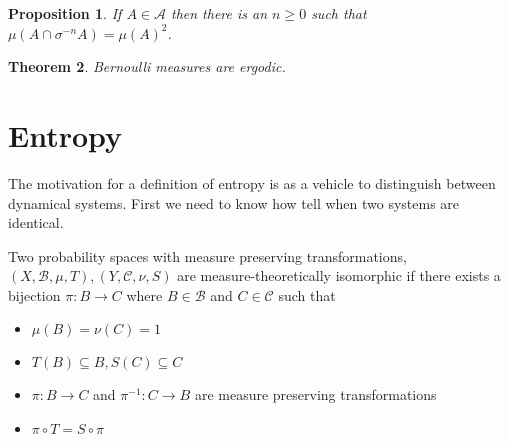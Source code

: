 \documentclass[11pt]{article}
\newenvironment{defin}
	{\begin{mdframed}[backgroundcolor=white, roundcorner=5pt, linewidth=1pt]}
	{\end{mdframed}}
\newcommand{\mdf}[1]{{\color{red} #1}}
\newtheorem{prop}{Proposition}[section]
\newtheorem{theorem}[prop]{Theorem}
\begin{document}
\begin{prop}
If $A\in\mathcal{A}$ then there is an $n\geq 0$ such that $\mu(A\cap \sigma^{-n}A)=\mu(A)^2$.
\end{prop}

\begin{theorem}
Bernoulli measures are ergodic.
\end{theorem}



\section{Entropy}
The motivation for a definition of entropy is as a vehicle to distinguish between dynamical systems. First we need to know how tell when two systems are identical.
\begin{defin}
	Two probability spaces with measure preserving transformations, $(X,\mathcal{B},\mu,T),(Y,\mathcal{C}, \nu, S)$ are \mdf{measure-theoretically isomorphic} if there exists a bijection $\pi:B\to C$ where $B\in\mathcal{B}$ and $C\in\mathcal{C}$ such that
	\begin{itemize}
		\item $\mu(B)=\nu(C)=1$
		\item $T(B)\subseteq B, S(C)\subseteq C$
		\item $\pi: B\to C$ and $\pi^{-1}:C\to B$ are measure preserving transformations
		\item $\pi\circ T = S\circ\pi$
		\begin{figure}[H]
			\centering
		\end{figure}	
	\end{itemize}
	

\end{defin}
\end{document}
